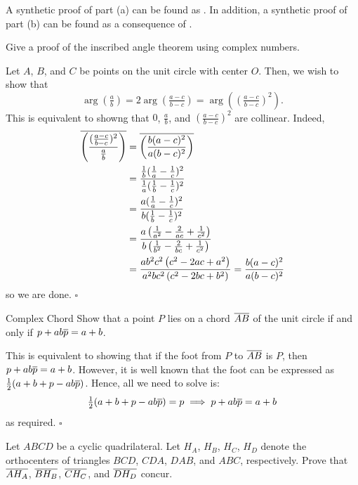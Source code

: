 \documentclass{article}
\begin{document}
\begin{remark*}
A synthetic proof of part (a) can be found as . In addition, a synthetic proof of part (b) can be found as a consequence of .
\end{remark*}

\begin{problem}[6.29]{}
Give a proof of the inscribed angle theorem using complex numbers.
\end{problem}

Let $A$, $B$, and $C$ be points on the unit circle with center $O$. Then, we wish to show that \[\arg\left(\tfrac{a}{b}\right) = 2\arg\left(\tfrac{a-c}{b-c}\right) = \arg\left(\left(\tfrac{a-c}{b-c}\right)^2\right).\] This is equivalent to showng that $0$, $\tfrac{a}{b}$, and $(\tfrac{a-c}{b-c})^2$ are collinear. Indeed, 
\begin{align*}
\overline{\left(\dfrac{(\tfrac{a-c}{b-c})^2}{\tfrac{a}{b}}\right)} &= \overline{\left(\dfrac{b(a-c)^2}{a(b-c)^2}\right)} \\
&= \dfrac{\tfrac{1}{b}(\tfrac{1}{a}-\tfrac{1}{c})^2}{\tfrac{1}{a}(\tfrac{1}{b}-\tfrac{1}{c})^2} \\
&= \dfrac{a(\tfrac{1}{a}-\tfrac{1}{c})^2}{b(\tfrac{1}{b}-\tfrac{1}{c})^2} \\
&= \dfrac{a\left(\tfrac{1}{a^2}-\tfrac{2}{ac}+\tfrac{1}{c^2}\right)}{b\left(\tfrac{1}{b^2}-\tfrac{2}{bc}+\tfrac{1}{c^2}\right)} \\
&= \dfrac{ab^2c^2\left(c^2-2ac+a^2\right)}{a^2bc^2\left(c^2-2bc+b^2\right)} = \dfrac{b(a-c)^2}{a(b-c)^2}
\end{align*}
so we are done. $\square$

\begin{problem}[6.30]{Complex Chord}
Show that a point $P$ lies on a chord $\overline{AB}$ of the unit circle if and only if $p + ab\overline{p} = a + b$. 
\end{problem}

This is equivalent to showing that if the foot from $P$ to $\overline{AB}$ is $P$, then $p + ab\overline{p} = a + b$. However, it is well known that the foot can be expressed as $\tfrac{1}{2}(a+b+p-ab\overline{p})$. Hence, all we need to solve is: \[\tfrac{1}{2}(a+b+p-ab\overline{p}) = p \implies p+ab\overline{p} = a+b\] as required. $\square$

\begin{problem}[6.31]{}
Let $ABCD$ be a cyclic quadrilateral. Let $H_A$, $H_B$, $H_C$, $H_D$ denote the orthocenters of triangles $BCD$, $CDA$, $DAB$, and $ABC$, respectively. Prove that $\overline{AH_A}$, $\overline{BH_B}$, $\overline{CH_C}$, and $\overline{DH_D}$ concur.
\end{problem}
\end{document}
